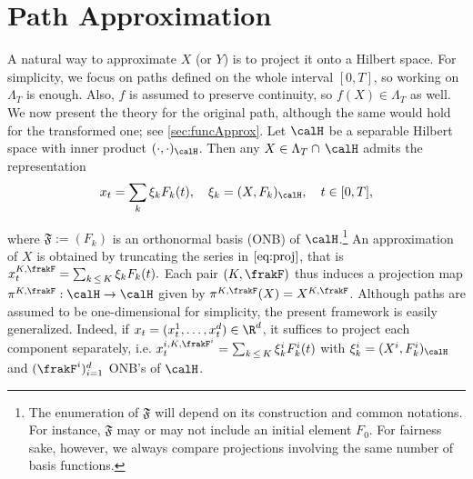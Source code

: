 \section{Path Approximation}
\label{sec:pathApprox}

 
 A natural way to approximate  $X$ (or $Y$) is to project it onto a Hilbert space. For simplicity, we focus on paths defined on the whole interval $[0,T]$, so working on $\Lambda_T$ is enough. Also, $f$ is assumed to preserve continuity, so $f(X)\in \Lambda_T$ as well.  We now  present the theory  for the original path, although the same would hold for the transformed one; see \cref{sec:funcApprox}.  
Let $\calH $ be a separable Hilbert space with inner product $(\cdot,\cdot)_{\calH}$. Then any  $X \in  \Lambda_T \cap \,  \calH $ admits the representation
\begin{equation}\label{eq:proj}
    x_t = \sum_{k} \xi_k F_k(t), \quad \xi_k = (X,F_k)_{\calH}, \quad t\in [0,T], 
\end{equation}
\vspace{-4mm}

where $\mathfrak{F} := (F_k)$ is an orthonormal basis (ONB) of $\calH$.\footnote{
The enumeration of $\mathfrak{F}$ will depend on its construction and
common notations. For instance, $\mathfrak{F}$ may or may not include an initial element $F_0$. For fairness sake, however, we always compare projections involving the same number of basis functions.} An  approximation of $X$ is obtained by truncating the  series in $\eqref{eq:proj}$, that is
$x^{K,\frakF}_t = \sum_{k\, \le\, K} \xi_k F_k(t).$ 
Each pair $(K,\frakF)$ thus induces a 
 projection map $\pi^{K,\frakF}:\calH \to \calH$ given by $\pi^{K,\frakF}(X)  = X^{K,\frakF}$. Although paths are assumed to be  one-dimensional for simplicity, the present framework is  easily generalized. Indeed, if $x_t = (x^1_t,\ldots,x^d_t) \in \R^d$,  it suffices to project each component separately, i.e. $x_t^{i,K,\frakF^i} =\sum_{k\, \le\, K} \xi^i_k F^i_k(t)$ with $\xi^i_k = (X^i,F^i_k)_{\calH}$ and $(\frakF^i)_{i=1}^{d}$ ONB's of $\calH$.
 
